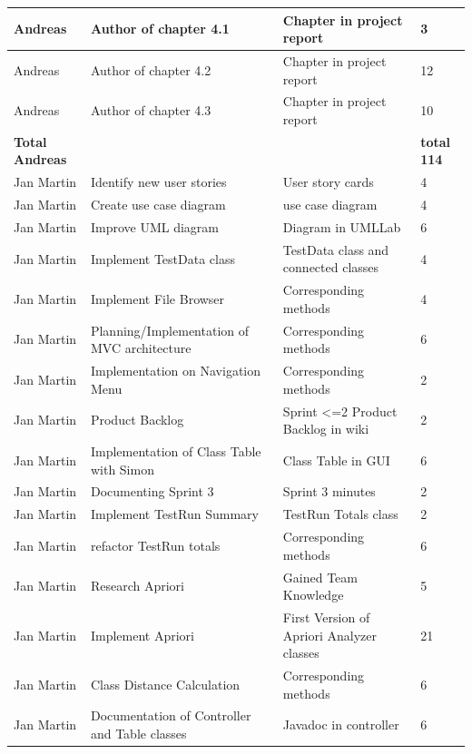 \begin{longtable}{|p{}||p{}|p{}|p{}|}
    \hline
    Andreas & Author of chapter 4.1 & Chapter in project report & 3 \\ 
    \hline
    Andreas & Author of chapter 4.2 & Chapter in project report & 12 \\
    \hline 
    Andreas & Author of chapter 4.3 & Chapter in project report & 10 \\ 
    \hline
    \hline 
    \textbf{Total \newline Andreas} & & & \textbf{total 114}   \\
    \hline
    \hline
    Jan Martin & Identify new user stories & User story cards & 4 \\
    \hline
    Jan Martin & Create use case diagram & use case diagram & 4 \\ 
    \hline
    Jan Martin & Improve UML diagram & Diagram in UMLLab & 6 \\ 
    \hline  
    Jan Martin & Implement TestData class & TestData class and connected classes & 4 \\ 
    \hline  
    Jan Martin & Implement File Browser & Corresponding methods & 4 \\ 
    \hline
    Jan Martin & Planning/Implementation of MVC architecture & Corresponding methods & 6 \\ 
    \hline  
    Jan Martin & Implementation on Navigation Menu & Corresponding methods & 2 \\ 
    \hline  
    Jan Martin & Product Backlog & Sprint <=2 Product Backlog in wiki & 2 \\ 
    \hline  
    Jan Martin & Implementation of Class Table with Simon & Class Table in GUI & 6 \\ 
    \hline  
    Jan Martin & Documenting Sprint 3 & Sprint 3 minutes & 2 \\ 
    \hline 
    Jan Martin & Implement TestRun Summary & TestRun Totals class & 2 \\ 
    \hline  
    Jan Martin & refactor TestRun totals & Corresponding methods & 6 \\ 
    \hline  
    Jan Martin & Research Apriori & Gained Team Knowledge & 5 \\ 
    \hline  
    Jan Martin & Implement Apriori & First Version of Apriori Analyzer classes & 21 \\ 
    \hline  
    Jan Martin & Class Distance Calculation & Corresponding methods & 6 \\ 
    \hline  
    Jan Martin & Documentation of Controller and Table classes & Javadoc in controller & 6 \\ 

\end{longtable}
